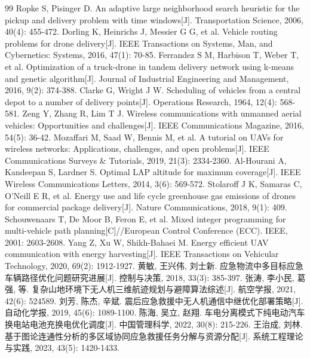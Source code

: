 \begin{thebibliography}{99}
   Ropke S, Pisinger D. An adaptive large neighborhood search heuristic for the pickup and delivery problem with time windows[J]. Transportation Science, 2006, 40(4): 455-472.
   Dorling K, Heinrichs J, Messier G G, et al. Vehicle routing problems for drone delivery[J]. IEEE Transactions on Systems, Man, and Cybernetics: Systems, 2016, 47(1): 70-85.
   Ferrandez S M, Harbison T, Weber T, et al. Optimization of a truck-drone in tandem delivery network using k-means and genetic algorithm[J]. Journal of Industrial Engineering and Management, 2016, 9(2): 374-388.
   Clarke G, Wright J W. Scheduling of vehicles from a central depot to a number of delivery points[J]. Operations Research, 1964, 12(4): 568-581.
   Zeng Y, Zhang R, Lim T J. Wireless communications with unmanned aerial vehicles: Opportunities and challenges[J]. IEEE Communications Magazine, 2016, 54(5): 36-42.
   Mozaffari M, Saad W, Bennis M, et al. A tutorial on UAVs for wireless networks: Applications, challenges, and open problems[J]. IEEE Communications Surveys \& Tutorials, 2019, 21(3): 2334-2360.
   Al-Hourani A, Kandeepan S, Lardner S. Optimal LAP altitude for maximum coverage[J]. IEEE Wireless Communications Letters, 2014, 3(6): 569-572.
   Stolaroff J K, Samaras C, O'Neill E R, et al. Energy use and life cycle greenhouse gas emissions of drones for commercial package delivery[J]. Nature Communications, 2018, 9(1): 409.
   Schouwenaars T, De Moor B, Feron E, et al. Mixed integer programming for multi-vehicle path planning[C]//European Control Conference (ECC). IEEE, 2001: 2603-2608.
   Yang Z, Xu W, Shikh-Bahaei M. Energy efficient UAV communication with energy harvesting[J]. IEEE Transactions on Vehicular Technology, 2020, 69(2): 1912-1927.
   黄敏, 王兴伟, 刘士新. 应急物流中多目标应急车辆路径优化问题研究进展[J]. 控制与决策, 2018, 33(3): 385-397.
   张涛, 李小民, 葛强, 等. 复杂山地环境下无人机三维航迹规划与避障算法综述[J]. 航空学报, 2021, 42(6): 524589.
   刘芳, 陈杰, 辛斌. 震后应急救援中无人机通信中继优化部署策略[J]. 自动化学报, 2019, 45(6): 1089-1100.
   陈海, 吴立, 赵翔. 车电分离模式下纯电动汽车换电站电池充换电优化调度[J]. 中国管理科学, 2022, 30(8): 215-226.
   王治成, 刘林. 基于图论连通性分析的多区域协同应急救援任务分解与资源分配[J]. 系统工程理论与实践, 2023, 43(5): 1420-1433.
\end{thebibliography}

